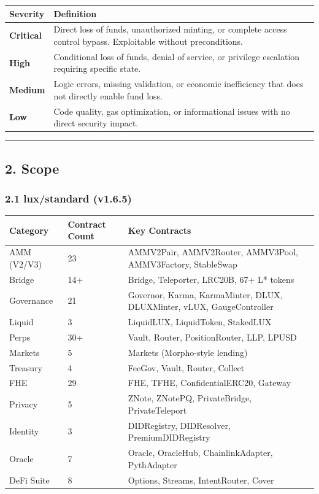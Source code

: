\documentclass[
]{article}
\newcounter{none} %
\begin{document}
{\def\LTcaptype{none} %
\begin{longtable}[]{@{}ll@{}}
\toprule\noalign{}
Severity & Definition \\
\midrule\noalign{}
\endhead
\bottomrule\noalign{}
\endlastfoot
\textbf{Critical} & Direct loss of funds, unauthorized minting, or
complete access control bypass. Exploitable without preconditions. \\
\textbf{High} & Conditional loss of funds, denial of service, or
privilege escalation requiring specific state. \\
\textbf{Medium} & Logic errors, missing validation, or economic
inefficiency that does not directly enable fund loss. \\
\textbf{Low} & Code quality, gas optimization, or informational issues
with no direct security impact. \\
\end{longtable}
}

\begin{center}\rule{0.5\linewidth}{0.5pt}\end{center}

\subsection{2. Scope}\label{2-scope}

\subsubsection{2.1 lux/standard (v1.6.5)}\label{21-luxstandard-v165}

{\def\LTcaptype{none} %
\begin{longtable}[]{@{}lll@{}}
\toprule\noalign{}
Category & Contract Count & Key Contracts \\
\midrule\noalign{}
\endhead
\bottomrule\noalign{}
\endlastfoot
AMM (V2/V3) & 23 & AMMV2Pair, AMMV2Router, AMMV3Pool, AMMV3Factory,
StableSwap \\
Bridge & 14+ & Bridge, Teleporter, LRC20B, 67+ L* tokens \\
Governance & 21 & Governor, Karma, KarmaMinter, DLUX, DLUXMinter, vLUX,
GaugeController \\
Liquid & 3 & LiquidLUX, LiquidToken, StakedLUX \\
Perps & 30+ & Vault, Router, PositionRouter, LLP, LPUSD \\
Markets & 5 & Markets (Morpho-style lending) \\
Treasury & 4 & FeeGov, Vault, Router, Collect \\
FHE & 29 & FHE, TFHE, ConfidentialERC20, Gateway \\
Privacy & 5 & ZNote, ZNotePQ, PrivateBridge, PrivateTeleport \\
Identity & 3 & DIDRegistry, DIDResolver, PremiumDIDRegistry \\
Oracle & 7 & Oracle, OracleHub, ChainlinkAdapter, PythAdapter \\
DeFi Suite & 8 & Options, Streams, IntentRouter, Cover \\
\end{longtable}
}
\end{document}
